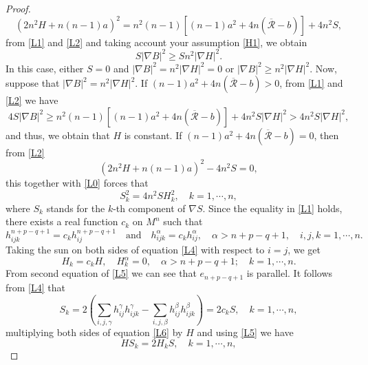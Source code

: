 \documentclass[leqno,11pt]{amsart}
\theoremstyle{plain}
\theoremstyle{definition}
\numberwithin{equation}{section}
\begin{document}
\begin{proof}
\begin{equation}
(2n^2H + n(n-1)a)^2 = n^2(n-1) [ (n-1)a^2 + 4n(\overline{\mathcal{R}}-b) ] + 4n^2 S,
\end{equation}
from \eqref{L1} and \eqref{L2} and taking account your assumption \eqref{H1}, we obtain
\begin{equation}
S|\nabla B|^2 \geq S n^2|\nabla H|^2.
\end{equation}
In this case, either $S=0$ and $|\nabla B|^2 = n^2|\nabla H|^2 = 0$ or $|\nabla B|^2 \geq n^2|\nabla H|^2.$ Now, suppose that $|\nabla B|^2 = n^2 |\nabla H|^2$. If $(n-1)a^2 + 4n(\overline{\mathcal{R}} - b) > 0$, from \eqref{L1} and \eqref{L2} we have
\begin{equation}
4S|\nabla B|^2 \geq n^2(n-1)[ (n-1)a^2 + 4n(\overline{\mathcal{R}} - b) ] + 4n^2S|\nabla H|^2 > 4n^2S|\nabla H|^2,
\end{equation}
and thus, we obtain that $H$ is constant. If $(n-1)a^2 + 4n(\overline{\mathcal{R}} - b) = 0$, then from \eqref{L2}
\begin{equation}\label{L3}
(2n^2H + n(n-1)a)^2 - 4n^2S = 0,
\end{equation}
this together with \eqref{L0} forces that
\begin{equation}\label{L4}
S^2_k = 4n^2SH_k^2, \quad k = 1, \cdots, n,
\end{equation}
where $S_k$ stands for the $k$-th component of $\nabla S$. Since the equality in \eqref{L1} holds, there exists a real function $c_k$ on $M^n$ such that 
\begin{equation}\label{L4}
h_{ijk}^{n+p-q+1} = c_k h_{ij}^{n+p-q+1} \quad \text{and} \quad h_{ijk}^{\alpha} = c_k h_{ij}^\alpha, \quad \alpha > n+p-q+1, \quad  i,j,k=1, \cdots, n.
\end{equation}
Taking the sun on both sides of equation \eqref{L4} with respect to $i=j$, we get
\begin{equation}\label{L5}
H_k = c_k H, \quad H^\alpha_k = 0, \quad \alpha > n+p-q+1; \quad k=1, \cdots, n.
\end{equation}
From second equation of \eqref{L5} we can see that $e_{n+p-q+1}$ is parallel. It follows from \eqref{L4} that
\begin{equation}\label{L6}
S_k = 2\left(\sum_{i,j,\gamma}h_{ij}^{\gamma}h_{ijk}^{\gamma}-\sum_{i,j,\beta}h_{ij}^{\beta}h_{ijk}^{\beta}\right) = 2c_kS, \quad k = 1, \cdots, n,
\end{equation}
multiplying both sides of equation \eqref{L6} by $H$ and using \eqref{L5} we have
\begin{equation}\label{L7}
HS_k = 2H_kS, \quad k=1, \cdots, n,    

\end{equation}
\end{proof}
\end{document}
